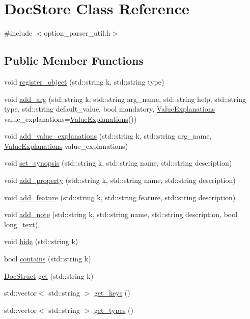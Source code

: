 \hypertarget{classDocStore}{\section{Doc\-Store Class Reference}
\label{classDocStore}
}


{\ttfamily \#include $<$option\-\_\-parser\-\_\-util.\-h$>$}

\subsection*{Public Member Functions}
\begin{DoxyCompactItemize}
\item 
void \hyperlink{classDocStore_a8b4c9409f58c965696b9b40f3c3566a6}{register\-\_\-object} (std\-::string k, std\-::string type)
\item 
void \hyperlink{classDocStore_ae14a668d96193c54cc7356a7e6dfe5ad}{add\-\_\-arg} (std\-::string k, std\-::string arg\-\_\-name, std\-::string help, std\-::string type, std\-::string default\-\_\-value, bool mandatory, \hyperlink{option__parser__util_8h_a916a9983a28a9efe2c606860052d5fe0}{Value\-Explanations} value\-\_\-explanations=\hyperlink{option__parser__util_8h_a916a9983a28a9efe2c606860052d5fe0}{Value\-Explanations}())
\item 
void \hyperlink{classDocStore_acb52135c577a1f483d0a716b1b8eee19}{add\-\_\-value\-\_\-explanations} (std\-::string k, std\-::string arg\-\_\-name, \hyperlink{option__parser__util_8h_a916a9983a28a9efe2c606860052d5fe0}{Value\-Explanations} value\-\_\-explanations)
\item 
void \hyperlink{classDocStore_ab1bb67c5d977b5f08784cb7342b5d082}{set\-\_\-synopsis} (std\-::string k, std\-::string name, std\-::string description)
\item 
void \hyperlink{classDocStore_a345d2e581ecec6a9449143bafec7b5a7}{add\-\_\-property} (std\-::string k, std\-::string name, std\-::string description)
\item 
void \hyperlink{classDocStore_a5f281c8bb7798d9fc7831cdf6602657f}{add\-\_\-feature} (std\-::string k, std\-::string feature, std\-::string description)
\item 
void \hyperlink{classDocStore_a8989ea881e708cfbb0876bd440d5c239}{add\-\_\-note} (std\-::string k, std\-::string name, std\-::string description, bool long\-\_\-text)
\item 
void \hyperlink{classDocStore_a1311dd8bd79cc4f549e4dc24f804af0b}{hide} (std\-::string k)
\item 
bool \hyperlink{classDocStore_a1ff4c822e32354a092b93ecaa394779a}{contains} (std\-::string k)
\item 
\hyperlink{structDocStruct}{Doc\-Struct} \hyperlink{classDocStore_aa41ed6e54cf6c61332cb0d037731593d}{get} (std\-::string k)
\item 
std\-::vector$<$ std\-::string $>$ \hyperlink{classDocStore_ace9674ccb03fa34d70ab2ced166d2e89}{get\-\_\-keys} ()
\item 
std\-::vector$<$ std\-::string $>$ \hyperlink{classDocStore_affba2ace14efcd69680d4b01bc57a28e}{get\-\_\-types} ()
\end{DoxyCompactItemize}
